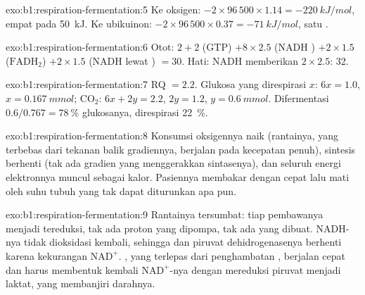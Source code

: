\begin{solution}{exo:b1:respiration-fermentation:5}
Ke oksigen: $-2\times 96\,500\times 1.14 = \qty{-220}{kJ/mol}$, empat
 pada \qty{50}{kJ}. Ke ubikuinon: $-2\times 96\,500\times 0.37 =
\qty{-71}{kJ/mol}$, satu .
\end{solution}

\begin{solution}{exo:b1:respiration-fermentation:6}
Otot: $2 + 2$ (GTP) $+ 8\times 2.5$ (NADH ) $+ 2\times
1.5$ ($\mathrm{FADH_2}$) $+ 2\times 1.5$ (NADH  lewat ) $=
30$. Hati: NADH  memberikan $2\times 2.5$: 32.
\end{solution}

\begin{solution}{exo:b1:respiration-fermentation:7}
RQ $= 2.2$. Glukosa yang direspirasi $x$: $6x = 1.0$,
$x = \qty{0.167}{mmol}$;
$\mathrm{CO_2}$: $6x + 2y = 2.2$, $2y = 1.2$, $y = \qty{0.6}{mmol}$.
Difermentasi $0.6/0.767 = \qty{78}{\%}$ glukosanya, direspirasi
\qty{22}{\%}.
\end{solution}

\begin{solution}{exo:b1:respiration-fermentation:8}
Konsumsi oksigennya naik (rantainya, yang terbebas dari tekanan balik
gradiennya, berjalan pada kecepatan penuh), sintesis  berhenti
(tak ada gradien yang menggerakkan sintasenya), dan seluruh energi
elektronnya muncul sebagai kalor. Pasiennya membakar  dengan
cepat lalu mati oleh suhu tubuh yang tak dapat diturunkan apa pun.
\end{solution}

\begin{solution}{exo:b1:respiration-fermentation:9}
Rantainya tersumbat: tiap pembawanya menjadi tereduksi, tak ada proton
yang dipompa, tak ada  yang dibuat. NADH-nya tidak dioksidasi
kembali, sehingga  dan piruvat dehidrogenasenya berhenti
karena kekurangan $\mathrm{NAD^+}$. , yang terlepas dari
penghambatan , berjalan cepat dan harus membentuk kembali
$\mathrm{NAD^+}$-nya dengan mereduksi piruvat menjadi laktat, yang
membanjiri darahnya.
\end{solution}

